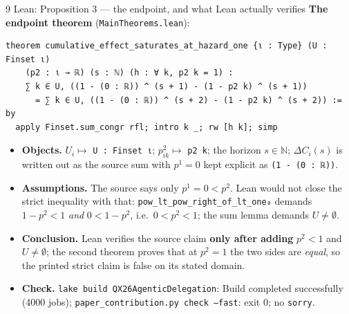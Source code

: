 \documentclass[aspectratio=169,11pt]{beamer}
\begin{document}
\begin{frame}[fragile]{9 \textperiodcentered{} Lean: Proposition 3 --- the endpoint, and what Lean actually verifies}
  \small\textbf{The endpoint theorem} (\texttt{MainTheorems.lean}):
\begin{lstlisting}
theorem cumulative_effect_saturates_at_hazard_one {ι : Type} (U : Finset ι)
    (p2 : ι → ℝ) (s : ℕ) (h : ∀ k, p2 k = 1) :
    ∑ k ∈ U, ((1 - (0 : ℝ)) ^ (s + 1) - (1 - p2 k) ^ (s + 1))
      = ∑ k ∈ U, ((1 - (0 : ℝ)) ^ (s + 2) - (1 - p2 k) ^ (s + 2)) := by
  apply Finset.sum_congr rfl; intro k _; rw [h k]; simp
\end{lstlisting}
  \begin{itemize}\small
    \item \textbf{Objects.} $U_i\mapsto$ \texttt{U : Finset ι}; $p^2_{ik}\mapsto$ \texttt{p2 k}; the horizon
      $s\in\mathbb N$; $\Delta C_i(s)$ is written out as the source sum with $p^1=0$ kept explicit as
      \texttt{(1 - (0 : ℝ))}.
    \item \textbf{Assumptions.} The source says only $p^1=0<p^2$. Lean would not close the strict
      inequality with that: \texttt{pow\_lt\_pow\_right\_of\_lt\_one₀} demands $1-p^2<1$ \emph{and}
      $0<1-p^2$, i.e.\ $0<p^2<1$; the sum lemma demands $U\neq\emptyset$.
    \item \textbf{Conclusion.} Lean verifies the source claim \textbf{only after adding} $p^2<1$ and
      $U\neq\emptyset$; the second theorem proves that at $p^2=1$ the two sides are \emph{equal}, so
      the printed strict claim is false on its stated domain.
    \item \textbf{Check.} \texttt{lake build QX26AgenticDelegation}: Build completed successfully (4000 jobs);
      \texttt{paper\_contribution.py check --fast}: exit 0; no \texttt{sorry}.
  \end{itemize}
\end{frame}
\end{document}
